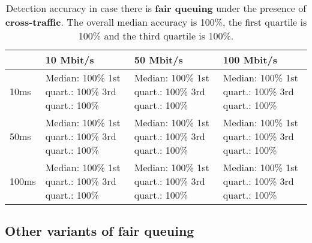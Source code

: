\documentclass[conference]{IEEEtran}
\begin{document}
\begin{table}
\begin{tabularx}{\columnwidth}{| l | X | X | X |}
\hline
& 10 Mbit/s & 50 Mbit/s & 100 Mbit/s \\ \hline
10ms & Median: 100\% \newline 1st quart.: 100\% \newline 3rd quart.: 100\% & Median: 100\% \newline 1st quart.: 100\% \newline 3rd quart.: 100\% & Median: 100\% \newline 1st quart.: 100\% \newline 3rd quart.: 100\%\\ \hline
50ms & Median: 100\% \newline 1st quart.: 100\% \newline 3rd quart.: 100\% & Median: 100\% \newline 1st quart.: 100\% \newline 3rd quart.: 100\% & Median: 100\% \newline 1st quart.: 100\% \newline 3rd quart.: 100\% \\ \hline
100ms & Median: 100\% \newline 1st quart.: 100\% \newline 3rd quart.: 100\% & Median: 100\% \newline 1st quart.: 100\% \newline 3rd quart.: 100\% & Median: 100\% \newline 1st quart.: 100\% \newline 3rd quart.: 100\% \\ \hline
\end{tabularx}
\caption{Detection accuracy in case there is \textbf{fair queuing} under the presence of \textbf{cross-traffic}.  The overall median accuracy is 100\%, the first quartile is 100\% and the third quartile is 100\%.}
\label{table:fq_crosstraffic}
\end{table}        

\subsection{Other variants of fair queuing}
\end{document}
